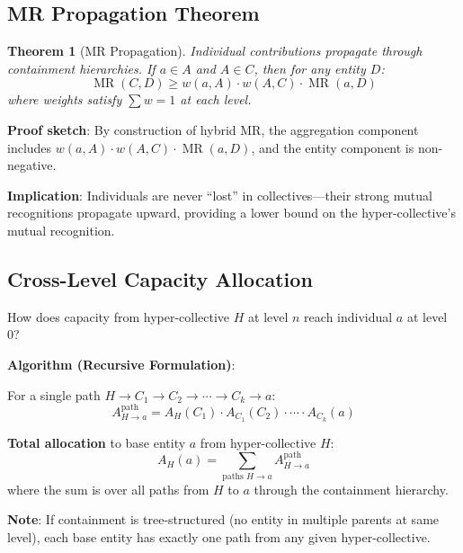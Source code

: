 \documentclass[11pt,a4paper]{article}
\newtheorem{theorem}{Theorem}[section]
\theoremstyle{definition}
\theoremstyle{remark}
\DeclareMathOperator{\MR}{MR}
\begin{document}
\subsection{MR Propagation Theorem}

\begin{theorem}[MR Propagation]
Individual contributions propagate through containment hierarchies. If $a \in A$ and $A \in C$, then for any entity $D$:
\[ \MR(C,D) \ge w(a,A) \cdot w(A,C) \cdot \MR(a,D) \]
where weights satisfy $\sum w = 1$ at each level.
\end{theorem}

\textbf{Proof sketch}: By construction of hybrid MR, the aggregation component includes $w(a,A) \cdot w(A,C) \cdot \MR(a,D)$, and the entity component is non-negative.

\textbf{Implication}: Individuals are never ``lost'' in collectives---their strong mutual recognitions propagate upward, providing a lower bound on the hyper-collective's mutual recognition.

\subsection{Cross-Level Capacity Allocation}

How does capacity from hyper-collective $H$ at level $n$ reach individual $a$ at level 0?

\textbf{Algorithm (Recursive Formulation)}:

For a single path $H \rightarrow C_1 \rightarrow C_2 \rightarrow \cdots \rightarrow C_k \rightarrow a$:
\[ A_{H \rightarrow a}^{\text{path}} = A_H(C_1) \cdot A_{C_1}(C_2) \cdot \cdots \cdot A_{C_k}(a) \]

\textbf{Total allocation} to base entity $a$ from hyper-collective $H$:
\[ A_H(a) = \sum_{\text{paths } H \rightarrow a} A_{H \rightarrow a}^{\text{path}} \]
where the sum is over all paths from $H$ to $a$ through the containment hierarchy.

\textbf{Note}: If containment is tree-structured (no entity in multiple parents at same level), each base entity has exactly one path from any given hyper-collective.
\end{document}
